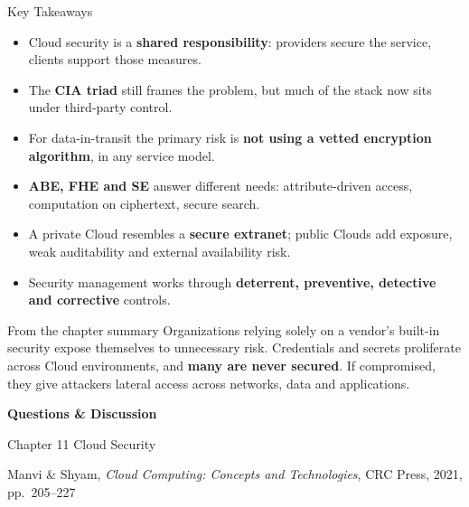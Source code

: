 \documentclass[11pt,aspectratio=169]{beamer}
\newcommand{\kw}[1]{\textbf{\color{accent}#1}}
\begin{document}
\begin{frame}{Key Takeaways}
  \begin{itemize}\footnotesize\setlength{\itemsep}{0.45em}
    \item Cloud security is a \kw{shared responsibility}: providers secure the
          service, clients support those measures.
    \item The \kw{CIA triad} still frames the problem, but much of the stack
          now sits under third-party control.
    \item For data-in-transit the primary risk is \kw{not using a vetted
          encryption algorithm}, in any service model.
    \item \kw{ABE, FHE and SE} answer different needs: attribute-driven access,
          computation on ciphertext, secure search.
    \item A private Cloud resembles a \kw{secure extranet}; public Clouds add
          exposure, weak auditability and external availability risk.
    \item Security management works through \kw{deterrent, preventive,
          detective and corrective} controls.
  \end{itemize}
  \vspace{0.4em}

  \begin{alertblock}{From the chapter summary}
    \scriptsize
    Organizations relying solely on a vendor's built-in security expose
    themselves to unnecessary risk. Credentials and secrets proliferate across
    Cloud environments, and \kw{many are never secured}. If compromised, they
    give attackers lateral access across networks, data and applications.
  \end{alertblock}
\end{frame}

\begin{frame}[plain]
  \vfill
  \centering
  {\LARGE\bfseries\color{accent}Questions \& Discussion}

  \vspace{1.4em}
  {\small\color{accentmid}
  Chapter 11 \textbullet{} Cloud Security\par
  \vspace{0.3em}
  Manvi \& Shyam, \emph{Cloud Computing: Concepts and Technologies},
  CRC Press, 2021, pp.\ 205--227}
  \vfill
\end{frame}
\end{document}
